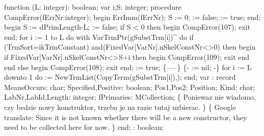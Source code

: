 function (L: integer): boolean;
var
   i,S: integer;
   procedure CompError(fErrNr:integer);
   begin
      ErrImm(fErrNr);
      S := 0;
       := false;
       := true;
   end;
begin
   S := dPrimLength-L;
    := false;
   if S < 0 then begin CompError(107); exit end;
   for i := 1 to L do
      with VarTrmPtr(gSubstTrm[i])^ do
         if (TrmSort=ikTrmConstant) and(FixedVar[VarNr].nSkelConstNr<>0) then
         begin
            if FixedVar[VarNr].nSkelConstNr<>S+i then begin CompError(109); exit end
         end
         else begin CompError(108); exit end;
    := true;
   \{-----\}
   \{-  := nil; -\}
   for i := L downto 1 do
       := NewTrmList(CopyTerm(gSubstTrm[i]),);
end;
\eatline
{}\nwendcode{}\nwdocspar
\nwenddocs{}\endmoddef\nwstartdeflinemarkup\nwenddeflinemarkup
var
   :
      record
         MeansOccurs: char;
         Specified,Positive: boolean;
         Pos1,Pos2: Position;
         Kind: char;
         LabNr,LabId,Length: integer;
         fPrimaries: MCollection;
         \{ Poniewaz nie wiadomo, czy bedzie nowy konstruktor,
           trzeba je na razie tutaj uzbierac.
         \}
         \{ Google translate:
           Since it is not known whether there will be a new constructor,
           they need to be collected here for now. \}
      end;
   : boolean;

